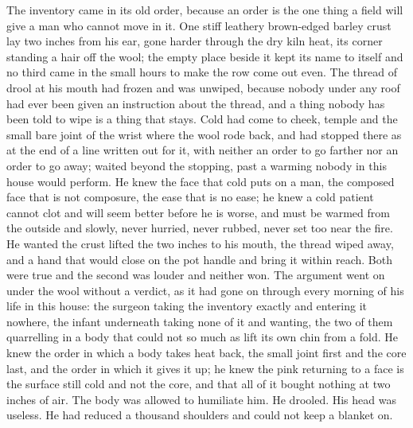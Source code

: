 The inventory came in its old order, because an order is the one thing a field will give a man who cannot move in it. One stiff leathery brown-edged barley crust lay two inches from his ear, gone harder through the dry kiln heat, its corner standing a hair off the wool; the empty place beside it kept its name to itself and no third came in the small hours to make the row come out even. The thread of drool at his mouth had frozen and was unwiped, because nobody under any roof had ever been given an instruction about the thread, and a thing nobody has been told to wipe is a thing that stays. Cold had come to cheek, temple and the small bare joint of the wrist where the wool rode back, and had stopped there as at the end of a line written out for it, with neither an order to go farther nor an order to go away;  waited beyond the stopping, past a warming nobody in this house would perform. He knew the face that cold puts on a man, the composed face that is not composure, the ease that is no ease; he knew a cold patient cannot clot and will seem better before he is worse, and must be warmed from the outside and slowly, never hurried, never rubbed, never set too near the fire. He wanted the crust lifted the two inches to his mouth, the thread wiped away, and a hand that would close on the pot handle and bring it within reach. Both were true and the second was louder and neither won. The argument went on under the wool without a verdict, as it had gone on through every morning of his life in this house: the surgeon taking the inventory exactly and entering it nowhere, the infant underneath taking none of it and wanting, the two of them quarrelling in a body that could not so much as lift its own chin from a fold. He knew the order in which a body takes heat back, the small joint first and the core last, and the order in which it gives it up; he knew the pink returning to a face is the surface still cold and not the core, and that all of it bought nothing at two inches of air. The body was allowed to humiliate him. He drooled. His head was useless. He had reduced a thousand shoulders and could not keep a blanket on.


